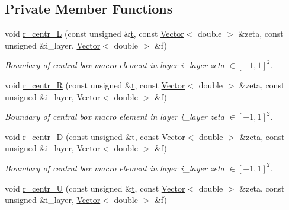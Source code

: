 \subsection*{Private Member Functions}
\begin{DoxyCompactItemize}
\item 
void \hyperlink{classoomph_1_1QuarterTubeDomain_ad150b2df8858d3936e7b6fb856de7ce1}{r\+\_\+centr\+\_\+L} (const unsigned \&\hyperlink{cfortran_8h_af6f0bd3dc13317f895c91323c25c2b8f}{t}, const \hyperlink{classoomph_1_1Vector}{Vector}$<$ double $>$ \&zeta, const unsigned \&i\+\_\+layer, \hyperlink{classoomph_1_1Vector}{Vector}$<$ double $>$ \&f)
\begin{DoxyCompactList}\small\item\em Boundary of central box macro element in layer i\+\_\+layer zeta $ \in [-1,1]^2 $. \end{DoxyCompactList}\item 
void \hyperlink{classoomph_1_1QuarterTubeDomain_ae7312c0c8754d36a69e475cbf97e479e}{r\+\_\+centr\+\_\+R} (const unsigned \&\hyperlink{cfortran_8h_af6f0bd3dc13317f895c91323c25c2b8f}{t}, const \hyperlink{classoomph_1_1Vector}{Vector}$<$ double $>$ \&zeta, const unsigned \&i\+\_\+layer, \hyperlink{classoomph_1_1Vector}{Vector}$<$ double $>$ \&f)
\begin{DoxyCompactList}\small\item\em Boundary of central box macro element in layer i\+\_\+layer zeta $ \in [-1,1]^2 $. \end{DoxyCompactList}\item 
void \hyperlink{classoomph_1_1QuarterTubeDomain_a4012aa5d6f8c535150823478164639c3}{r\+\_\+centr\+\_\+D} (const unsigned \&\hyperlink{cfortran_8h_af6f0bd3dc13317f895c91323c25c2b8f}{t}, const \hyperlink{classoomph_1_1Vector}{Vector}$<$ double $>$ \&zeta, const unsigned \&i\+\_\+layer, \hyperlink{classoomph_1_1Vector}{Vector}$<$ double $>$ \&f)
\begin{DoxyCompactList}\small\item\em Boundary of central box macro element in layer i\+\_\+layer zeta $ \in [-1,1]^2 $. \end{DoxyCompactList}\item 
void \hyperlink{classoomph_1_1QuarterTubeDomain_afb2013af63e8207676102ee16d856dca}{r\+\_\+centr\+\_\+U} (const unsigned \&\hyperlink{cfortran_8h_af6f0bd3dc13317f895c91323c25c2b8f}{t}, const \hyperlink{classoomph_1_1Vector}{Vector}$<$ double $>$ \&zeta, const unsigned \&i\+\_\+layer, \hyperlink{classoomph_1_1Vector}{Vector}$<$ double $>$ \&f)

\end{DoxyCompactItemize}
